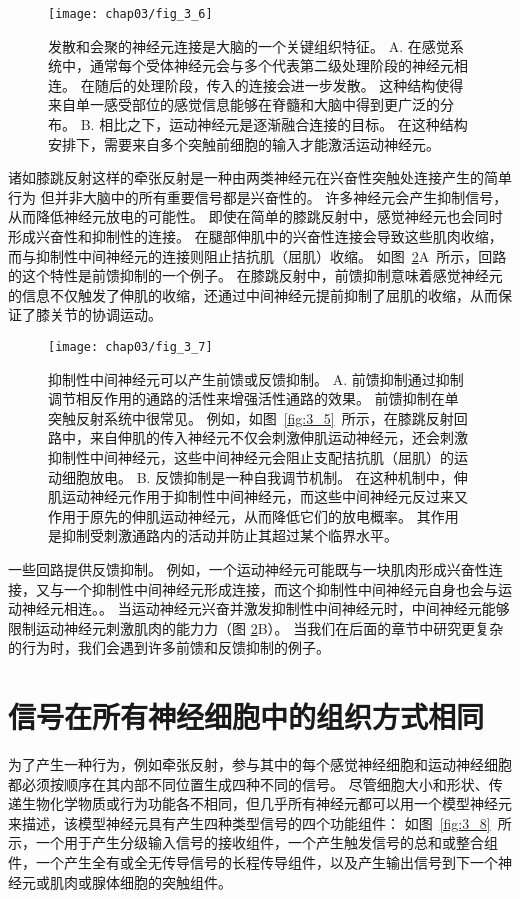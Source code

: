 \begin{figure}[htbp]
	\centering
	\texttt{[image: chap03/fig\_3\_6]}
	\caption{发散和会聚的神经元连接是大脑的一个关键组织特征。
		A. 在感觉系统中，通常每个受体神经元会与多个代表第二级处理阶段的神经元相连。 
		在随后的处理阶段，传入的连接会进一步发散。 
		这种结构使得来自单一感受部位的感觉信息能够在脊髓和大脑中得到更广泛的分布。
		B. 相比之下，运动神经元是逐渐融合连接的目标。 
		在这种结构安排下，需要来自多个突触前细胞的输入才能激活运动神经元。}
	\label{fig:3_6}
\end{figure}


诸如膝跳反射这样的牵张反射是一种由两类神经元在兴奋性突触处连接产生的简单行为 
但并非大脑中的所有重要信号都是兴奋性的。 
许多神经元会产生抑制信号，从而降低神经元放电的可能性。 
即使在简单的膝跳反射中，感觉神经元也会同时形成兴奋性和抑制性的连接。 
在腿部伸肌中的兴奋性连接会导致这些肌肉收缩，而与抑制性中间神经元的连接则阻止拮抗肌（屈肌）收缩。 
如图~\ref{fig:3_7}A~所示，回路的这个特性是前馈抑制的一个例子。 
在膝跳反射中，前馈抑制意味着感觉神经元的信息不仅触发了伸肌的收缩，还通过中间神经元提前抑制了屈肌的收缩，从而保证了膝关节的协调运动。


\begin{figure}[htbp]
	\centering
	\texttt{[image: chap03/fig\_3\_7]}
	\caption{抑制性中间神经元可以产生前馈或反馈抑制。
		A. 前馈抑制通过抑制调节相反作用的通路的活性来增强活性通路的效果。
		前馈抑制在单突触反射系统中很常见。 
		例如，如图~\ref{fig:3_5}~所示，在膝跳反射回路中，来自伸肌的传入神经元不仅会刺激伸肌运动神经元，还会刺激抑制性中间神经元，这些中间神经元会阻止支配拮抗肌（屈肌）的运动细胞放电。
		B. 反馈抑制是一种自我调节机制。
		在这种机制中，伸肌运动神经元作用于抑制性中间神经元，而这些中间神经元反过来又作用于原先的伸肌运动神经元，从而降低它们的放电概率。
		其作用是抑制受刺激通路内的活动并防止其超过某个临界水平。}
	\label{fig:3_7}
\end{figure}


一些回路提供反馈抑制。 
例如，一个运动神经元可能既与一块肌肉形成兴奋性连接，又与一个抑制性中间神经元形成连接，而这个抑制性中间神经元自身也会与运动神经元相连。。 
当运动神经元兴奋并激发抑制性中间神经元时，中间神经元能够限制运动神经元刺激肌肉的能力力（图 \ref{fig:3_7}B）。 
当我们在后面的章节中研究更复杂的行为时，我们会遇到许多前馈和反馈抑制的例子。


\section{信号在所有神经细胞中的组织方式相同}
为了产生一种行为，例如牵张反射，参与其中的每个感觉神经细胞和运动神经细胞都必须按顺序在其内部不同位置生成四种不同的信号。
尽管细胞大小和形状、传递生物化学物质或行为功能各不相同，但几乎所有神经元都可以用一个模型神经元来描述，该模型神经元具有产生四种类型信号的四个功能组件：
如图~\ref{fig:3_8}~所示，一个用于产生分级输入信号的接收组件，一个产生触发信号的总和或整合组件，一个产生全有或全无传导信号的长程传导组件，以及产生输出信号到下一个神经元或肌肉或腺体细胞的突触组件。


